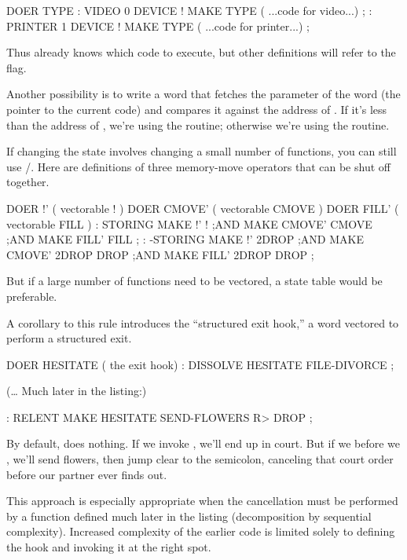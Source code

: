 \begin{Code}
DOER TYPE
: VIDEO   0 DEVICE !  MAKE TYPE
     ( ...code for video...) ;
: PRINTER   1 DEVICE !  MAKE TYPE
     ( ...code for printer...) ;
\end{Code}
Thus  already knows which code to execute, but other definitions
will refer to the flag.

Another possibility is to write a word that fetches the parameter of the
 word  (the pointer to the current code) and
compares it against the address of . If it's less than the
address of , we're using the  routine;
otherwise we're using the  routine.

If changing the state involves changing a small number of functions,
you can still use /. Here are definitions of three
memory-move operators that can be shut off together.

\begin{Code}
DOER !'  ( vectorable ! )
DOER CMOVE'  ( vectorable CMOVE )
DOER FILL'  ( vectorable FILL )
: STORING   MAKE !' ! ;AND
            MAKE CMOVE'  CMOVE ;AND
            MAKE FILL'  FILL ;
: -STORING  MAKE !'  2DROP ;AND
            MAKE CMOVE'  2DROP DROP ;AND
            MAKE FILL'  2DROP DROP ;
\end{Code}
But if a large number of functions need to be vectored, a state table
would be preferable.

A corollary to this rule introduces the ``structured exit hook,'' a
 word vectored to perform a structured exit.

\begin{Code}
DOER HESITATE  ( the exit hook)
: DISSOLVE   HESITATE  FILE-DIVORCE ;
\end{Code}
(\dots{} Much later in the listing:)
\begin{Code}
: RELENT   MAKE HESITATE   SEND-FLOWERS  R> DROP ;
\end{Code}
By default,  does nothing. If we invoke ,
we'll end up in court. But if we  before we
, we'll send flowers, then jump clear to the semicolon,
canceling that court order before our partner ever finds out.

This approach is especially appropriate when the cancellation must be
performed by a function defined much later in the listing (decomposition
by sequential complexity). Increased complexity of the earlier code is
limited solely to defining the hook and invoking it at the right spot.%

